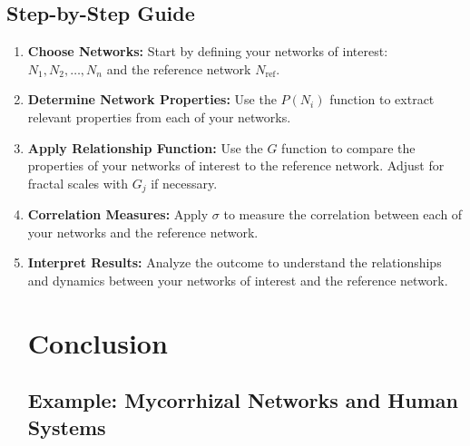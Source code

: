 \documentclass[sn-nature]{sn-jnl}%
\theoremstyle{thmstyleone}%
\theoremstyle{thmstyletwo}%
\theoremstyle{thmstylethree}%
\begin{document}
\subsection*{Step-by-Step Guide}
\begin{enumerate}
    \item \textbf{Choose Networks:} Start by defining your networks of interest: \(N_1, N_2, \dots, N_n\) and the reference network \(N_{\text{ref}}\).
    \item \textbf{Determine Network Properties:} Use the \(P(N_i)\) function to extract relevant properties from each of your networks.
    \item \textbf{Apply Relationship Function:} Use the \(G\) function to compare the properties of your networks of interest to the reference network. Adjust for fractal scales with \(G_j\) if necessary.
    \item \textbf{Correlation Measures:} Apply \(\sigma\) to measure the correlation between each of your networks and the reference network.
    \item \textbf{Interpret Results:} Analyze the outcome to understand the relationships and dynamics between your networks of interest and the reference network.
\section{Conclusion}
\subsection{Example: Mycorrhizal Networks and Human Systems}

\end{enumerate}
\end{document}
